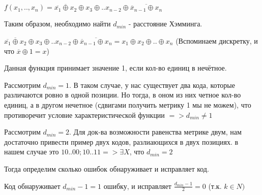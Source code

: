 \documentclass[../main.tex]{subfiles}
\begin{document}
\setlength{\parskip}{0em}

$f(x_1, .., x_n) = \overline{\overline{x_1} \oplus x_2} \oplus x_3 \oplus .. x_{n-2} \oplus \overline{\overline{x}_{n-1} \oplus x_{n}}$

Таким образом, необходимо найти $d_{min}$ - расстояние Хэмминга. 

$\overline{\overline{x_1} \oplus x_2} \oplus x_3 \oplus .. x_{n-2} \oplus \overline{\overline{x}_{n-1} \oplus x_{n}} = x_1\oplus x_2 \oplus .. \oplus x_n$ (Вспоминаем дискретку, и что $\overline{x} \oplus 1 = x$)

Данная функция принимает значение 1, если кол-во единиц в нечётное.

Рассмотрим $d_{min}=1$. В таком случае, у нас существует два кода, которые различаются ровно в одной позиции. Но тогда, в оном из них четное кол-во единиц, а в другом нечетное (сдвигами получить метрику 1 мы не можем), что противоречит условие характеристической функции $=> d_{min} \neq 1$

Рассмотрим $d_{min}=2$. Для док-ва возможности равенства метрике двум, нам достаточно привести пример двух кодов, разлиающихся в двух позициях. в нашем случае это $10..00; 10..11 => \exists X$, что $d_{min} =2$

Тогда определим сколько ошибок обнаруживает и исправляет код.

Код обнаруживает $d_{min} - 1 = 1$ ошибку, и исправляет $\frac{d_{min} -1}{2} =0$ (т.к. $ k \in N)$
\end{document}
